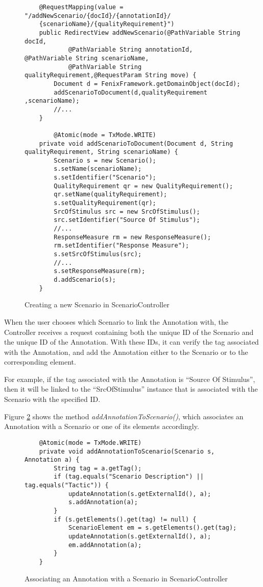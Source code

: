 \begin{figure}[h]
\lstset{style=customjava}
\begin{lstlisting}
	@RequestMapping(value = "/addNewScenario/{docId}/{annotationId}/
	{scenarioName}/{qualityRequirement}")
	public RedirectView addNewScenario(@PathVariable String docId,
			@PathVariable String annotationId, @PathVariable String scenarioName, 
			@PathVariable String qualityRequirement,@RequestParam String move) {
		Document d = FenixFramework.getDomainObject(docId);
		addScenarioToDocument(d,qualityRequirement ,scenarioName);		
		//...
	}
	
		@Atomic(mode = TxMode.WRITE)
	private void addScenarioToDocument(Document d, String qualityRequirement, String scenarioName) {
		Scenario s = new Scenario();
		s.setName(scenarioName);
		s.setIdentifier("Scenario");
		QualityRequirement qr = new QualityRequirement();
		qr.setName(qualityRequirement);
		s.setQualityRequirement(qr);
		SrcOfStimulus src = new SrcOfStimulus();
		src.setIdentifier("Source Of Stimulus");
		//...
		ResponseMeasure rm = new ResponseMeasure();
		rm.setIdentifier("Response Measure");
		s.setSrcOfStimulus(src);
		//...
		s.setResponseMeasure(rm);
		d.addScenario(s);
	}	
\end{lstlisting}
\caption{Creating a new Scenario in ScenarioController}
\label{figure:scenarioControllerNewScenario}
\end{figure}

When the user chooses which Scenario to link the Annotation with, the Controller receives a request containing both the unique ID of the Scenario and the unique ID of the Annotation. With these IDs, it can verify the tag associated with the Annotation, and add the Annotation either to the Scenario or to the corresponding element. 

For example, if the tag associated with the Annotation is ``Source Of Stimulus'', then it will be linked to the ``SrcOfStimulus'' instance that is associated with the Scenario with the specified ID.

Figure \ref{figure:scenarioControllerLinkAnnotation} shows the method \textit{addAnnotationToScenario()}, which associates an Annotation with a Scenario or one of its elements accordingly.

\begin{figure}[h]
\lstset{style=customjava}
\begin{lstlisting}
	@Atomic(mode = TxMode.WRITE)
	private void addAnnotationToScenario(Scenario s, Annotation a) {
		String tag = a.getTag();
		if (tag.equals("Scenario Description") || tag.equals("Tactic")) {
			updateAnnotation(s.getExternalId(), a);
			s.addAnnotation(a);
		}
		if (s.getElements().get(tag) != null) {
			ScenarioElement em = s.getElements().get(tag);
			updateAnnotation(s.getExternalId(), a);
			em.addAnnotation(a);
		}
	}	
\end{lstlisting}
\caption{Associating an Annotation with a Scenario in ScenarioController}
\label{figure:scenarioControllerLinkAnnotation}
\end{figure}


